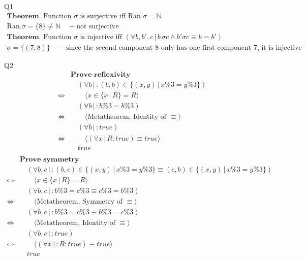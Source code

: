 \documentclass{article}
\begin{document}
    \vspace{10mm}
    Q1
    \begin{gather*}
        \textbf{Theorem. }\text{Function } \sigma \text{ is surjective iff Ran} .\sigma = \mathbb{N} \\
        \text{Ran}.\sigma=\{8\}\neq\mathbb{N}\quad-\text{not surjective} \\
        \textbf{Theorem. }\text{Function } \sigma \text{ is injective iff } (\forall b,b',c\,|\, b\,\sigma c \land b'\sigma c \equiv b=b')\\
        \sigma = \{(7,8)\}\quad -\text{since the second component 8 only has one first component 7, it is injective}
    \end{gather*}

    \vspace{10mm}
    Q2
    \begin{align*}
    & \textbf{Prove reflexivity} \\
    & \quad (\forall b\,|\,: (b,b)\in \{(x,y)\,|\, x\%3=y\%3\}) \\
    \Longleftrightarrow & \qquad \langle x\in\{x\,|\,R\}=R \rangle \\
    & \quad (\forall b\,|\,: b\%3=b\%3) \\
    \Longleftrightarrow & \qquad \langle \text{Metatheorem, Identity of } \equiv \rangle \\
    & \quad (\forall b\,|\,: true) \\
    \Longleftrightarrow & \qquad \langle (\forall x\,|\, R: true) \equiv true \rangle \\
    & \quad true \\
    \end{align*}
    \begin{align*}
    & \textbf{Prove symmetry} \\
    & \quad (\forall b,c\,|\,: (b,c)\in \{(x,y)\,|\, x\%3=y\%3\} \equiv (c,b)\in \{(x,y)\,|\, x\%3=y\%3\}) \\
    \Longleftrightarrow & \qquad \langle x\in\{x\,|\,R\}=R \rangle \\
    & \quad (\forall b,c\,|\,: b\%3=c\%3 \equiv c\%3=b\%3) \\
    \Longleftrightarrow & \qquad \langle
\text{Metatheorem, Symmetry of } \equiv \rangle \\
    & \quad (\forall b,c\,|\,: b\%3=c\%3 \equiv b\%3=c\%3) \\
    \Longleftrightarrow & \qquad \langle \text{Metatheorem, Identity of } \equiv \rangle \\
    & \quad (\forall b,c\,|\,: true) \\
    \Longleftrightarrow & \qquad \langle (\forall x\,|\,: R: true) \equiv true \rangle \\
    & \quad true \\
    \end{align*}
\end{document}
